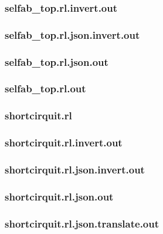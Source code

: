 \subsubsection{selfab\_top.rl.invert.out}
\label{app:selfab_top_rl.invert.out}

\subsubsection{selfab\_top.rl.json.invert.out}
\label{app:selfab_top_rl.json.invert.out}

\subsubsection{selfab\_top.rl.json.out}
\label{app:selfab_top_rl.json.out}

\subsubsection{selfab\_top.rl.out}
\label{app:selfab_top_rl.out}

\subsubsection{shortcirquit.rl}
\label{app:shortcirquit_rl}

\subsubsection{shortcirquit.rl.invert.out}
\label{app:shortcirquit_rl.invert.out}

\subsubsection{shortcirquit.rl.json.invert.out}
\label{app:shortcirquit_rl.json.invert.out}

\subsubsection{shortcirquit.rl.json.out}
\label{app:shortcirquit_rl.json.out}

\subsubsection{shortcirquit.rl.json.translate.out}
\label{app:shortcirquit_rl.json.translate.out}


